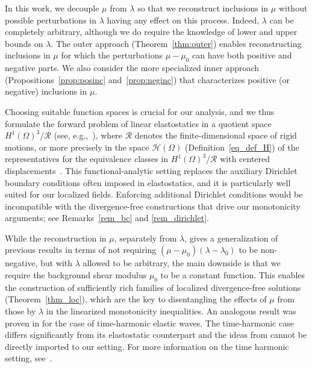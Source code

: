 \documentclass[reqno]{amsart}
\numberwithin{equation}{section}
\numberwithin{figure}{section}
\numberwithin{table}{section}
\theoremstyle{definition}
\theoremstyle{plain}
\theoremstyle{definition}
\theoremstyle{remark}
\numberwithin{equation}{section}
\begin{document}
In this work, we decouple $\mu$ from $\lambda$ so that we reconstruct inclusions in $\mu$ without possible perturbations in  $\lambda$ having any effect on this process. Indeed, $\lambda$ can be completely arbitrary, although we do require the knowledge of lower and upper bounds on $\lambda$. The outer approach (Theorem~\ref{thm:outer}) enables reconstructing inclusions in $\mu$ for which the perturbations $\mu-\mu_0$ can have both positive and negative parts. We also consider the more specialized inner approach (Propositions~\ref{prop:posinc} and~\ref{prop:neginc}) that characterizes positive (or negative) inclusions in $\mu$. 

Choosing suitable function spaces is crucial for our analysis, and we thus formulate the forward problem of linear elastostatics in a quotient space $H^1(\Omega)^3/\mathcal{R}$ (see, e.g.,~\cite{Ciarlet78, Kaleem26}), where $\mathcal{R}$ denotes the finite-dimensional space of rigid motions, or more precisely in the space $\mathcal{H}(\Omega)$  (Definition~\ref{eq_def_H}) of the representatives for the
equivalence classes in $H^1(\Omega)^3/\mathcal{R}$ with centered displacements~\cite[section 5]{Kaleem26}. This functional-analytic setting replaces the auxiliary Dirichlet boundary conditions often imposed in elastostatics, and it is particularly well suited for our localized fields. Enforcing additional Dirichlet conditions would be incompatible with the divergence-free constructions that drive our monotonicity arguments; see Remarks~\ref{rem_bc} and  \ref{rem_dirichlet}.

While the reconstruction in $\mu$, separately from $\lambda$, gives a generalization of previous results in terms of not requiring $(\mu-\mu_0)(\lambda-\lambda_0)$ to be non-negative, but with $\lambda$ allowed to be arbitrary, the main downside is that we require the background shear modulus $\mu_0$ to be a constant function. This enables the construction of sufficiently rich families of localized divergence-free solutions (Theorem~\ref{thm_loc}), which are the key to disentangling the effects of $\mu$ from those by $\lambda$ in the linearized monotonicity inequalities. An analogous result was proven in \cite{EP26} for the case of time-harmonic elastic waves. The time-harmonic case differs significantly from its elastostatic counterpart and the ideas from \cite{EP26} cannot be directly imported to our setting. For more information on the time harmonic setting, see~\cite{EP26,EP23,HPS19b,HPS19a}.
\end{document}
